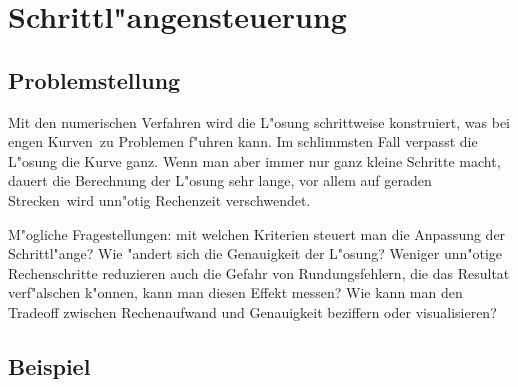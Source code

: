 \chapter{Schrittl"angensteuerung\label{chapter:schrittlaenge}}
\begin{refsection}


\section{Problemstellung}

Mit den numerischen Verfahren wird die L"osung schrittweise konstruiert, was bei \glqq engen Kurven\grqq~zu Problemen f"uhren kann.
Im schlimmsten Fall verpasst die L"osung die Kurve ganz.
Wenn man aber immer nur ganz kleine Schritte macht, dauert die Berechnung der L"osung sehr lange, vor allem auf \glqq geraden Strecken\grqq~wird unn"otig Rechenzeit verschwendet.

M"ogliche Fragestellungen: mit welchen Kriterien steuert man die Anpassung der Schrittl"ange?
Wie "andert sich die Genauigkeit der L"osung?
Weniger unn"otige Rechenschritte reduzieren auch die Gefahr von Rundungsfehlern, die das Resultat verf"alschen k"onnen, kann man diesen Effekt messen?
Wie kann man den Tradeoff zwischen Rechenaufwand und Genauigkeit beziffern oder visualisieren?


\section{Beispiel}


\end{refsection}
